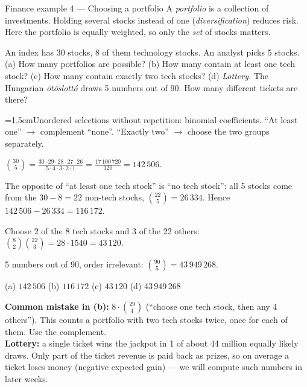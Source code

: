 \begin{fin}{Finance example 4 --- Choosing a portfolio}
	\context A \emph{portfolio} is a collection of investments. Holding several
	stocks instead of one (\emph{diversification}) reduces risk. Here the
	portfolio is equally weighted, so only the \emph{set} of stocks matters.

	An index has 30 stocks, 8 of them technology stocks. An analyst picks 5
	stocks. (a) How many portfolios are possible? (b) How many contain at least
	one tech stock? (c) How many contain exactly two tech stocks?
	(d) \emph{Lottery.} The Hungarian \emph{ötöslottó} draws 5 numbers out of
	90. How many different tickets are there?
\end{fin}
\workspace{4cm}

\ifsolutions
	\soltitle
	{\emergencystretch=1.5em\idea Unordered selections without repetition: binomial coefficients. ``At
	least one'' $\to$ complement ``none''. ``Exactly two'' $\to$ choose the two
	groups separately.\par}

	$\displaystyle\binom{30}{5}=\frac{30\cdot29\cdot28\cdot27\cdot26}{5\cdot4\cdot3\cdot2\cdot1}
		=\frac{17\,100\,720}{120}=142\,506.$

	 The opposite of ``at least one tech stock'' is ``no tech stock'':
	all 5 stocks come from the $30-8=22$ non-tech stocks, $\binom{22}{5}=26\,334$.
	Hence $142\,506-26\,334=116\,172$.

	 Choose 2 of the 8 tech stocks and 3 of the 22 others:
	$\binom82\binom{22}{3}=28\cdot1540=43\,120$.

	 5 numbers out of 90, order irrelevant:
	$\binom{90}{5}=43\,949\,268$.

	\begin{answer}
		(a) $142\,506$ \quad (b) $116\,172$ \quad (c) $43\,120$ \quad
		(d) $43\,949\,268$
	\end{answer}
	\begin{remark}
		\textbf{Common mistake in (b):} $8\cdot\binom{29}{4}$ (``choose one tech
		stock, then any 4 others''). This counts a portfolio with two tech stocks
		twice, once for each of them. Use the complement.\\
		\textbf{Lottery:} a single ticket wins the jackpot in 1 of about 44 million
		equally likely draws. Only part of the ticket revenue is paid back as
		prizes, so on average a ticket loses money (negative expected gain) --- we
		will compute such numbers in later weeks.
	\end{remark}
\fi

